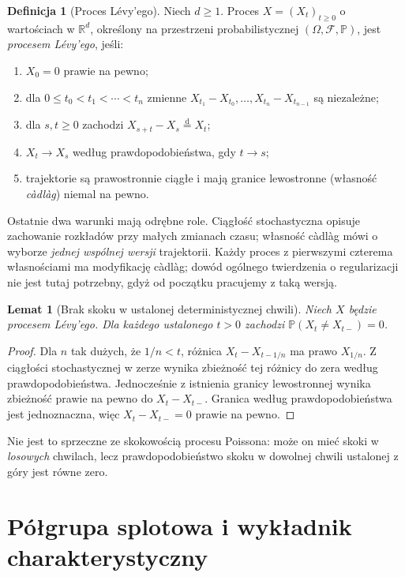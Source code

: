 \documentclass[11pt,a4paper,oneside]{report}
\numberwithin{equation}{chapter}
\theoremstyle{plain}
\newtheorem{lemat}[twierdzenie]{Lemat}
\theoremstyle{definition}
\newtheorem{definicja}{Definicja}[chapter]
\theoremstyle{remark}
\newcommand{\R}{\mathbb{R}}
\newcommand{\Prob}{\mathbb{P}}
\newcommand{\calF}{\mathcal{F}}
\begin{document}
\begin{definicja}[Proces Lévy'ego]\label{def:volIII:10:01}
\label{def:levy}
Niech $d\ge1$. Proces $X=(X_t)_{t\ge0}$ o wartościach w
$\R^d$, określony na przestrzeni probabilistycznej
$(\Omega,\calF,\Prob)$, jest \emph{procesem Lévy'ego}, jeśli:
\begin{enumerate}
\item $X_0=0$ prawie na pewno;
\item dla $0\le t_0<t_1<\cdots<t_n$ zmienne
$X_{t_1}-X_{t_0},\ldots,X_{t_n}-X_{t_{n-1}}$ są niezależne;
\item dla $s,t\ge0$ zachodzi
$X_{s+t}-X_s\overset{\mathrm d}=X_t$;
\item $X_t\to X_s$ według prawdopodobieństwa, gdy $t\to s$;
\item trajektorie są prawostronnie ciągłe i mają granice lewostronne
(własność \emph{càdlàg}) niemal na pewno.
\end{enumerate}
\end{definicja}

Ostatnie dwa warunki mają odrębne role. Ciągłość stochastyczna
opisuje zachowanie rozkładów przy małych zmianach czasu;
własność càdlàg mówi o wyborze \emph{jednej wspólnej wersji}
trajektorii. Każdy proces z pierwszymi czterema własnościami
ma modyfikację càdlàg; dowód ogólnego twierdzenia o regularizacji
nie jest tutaj potrzebny, gdyż od początku pracujemy z taką wersją.

\begin{lemat}[Brak skoku w ustalonej deterministycznej chwili]\label{lem:volIII:10:01}
\label{lem:levy-no-fixed-jumps}
Niech $X$ będzie procesem Lévy'ego. Dla każdego ustalonego
$t>0$ zachodzi $\Prob(X_t\ne X_{t-})=0$.
\end{lemat}
\begin{proof}
Dla $n$ tak dużych, że $1/n<t$, różnica
$X_t-X_{t-1/n}$ ma prawo $X_{1/n}$. Z ciągłości
stochastycznej w zerze wynika zbieżność tej różnicy do
zera według prawdopodobieństwa. Jednocześnie z istnienia
granicy lewostronnej wynika zbieżność prawie na pewno do
$X_t-X_{t-}$. Granica według prawdopodobieństwa jest
jednoznaczna, więc $X_t-X_{t-}=0$ prawie na pewno.
\end{proof}

Nie jest to sprzeczne ze skokowością procesu Poissona:
może on mieć skoki w \emph{losowych} chwilach, lecz
prawdopodobieństwo skoku w dowolnej chwili ustalonej z góry
jest równe zero.

\section{Półgrupa splotowa i wykładnik charakterystyczny}\label{sec:volIII:10:02}
\end{document}
